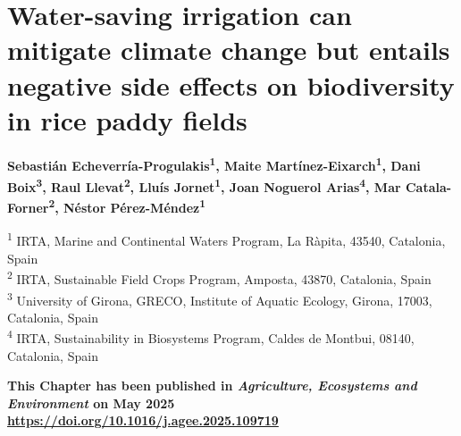\chapter{Water-saving irrigation can mitigate climate change but entails negative side effects on biodiversity in rice paddy fields}
\label{Chapter1}

\begin{center}
\textbf{
Sebastián Echeverría-Progulakis\textsuperscript{1},
Maite Martínez-Eixarch\textsuperscript{1},
Dani Boix\textsuperscript{3},
Raul Llevat\textsuperscript{2},
Lluís Jornet\textsuperscript{1},
Joan Noguerol Arias\textsuperscript{4},
Mar Catala-Forner\textsuperscript{2},
Néstor Pérez-Méndez\textsuperscript{1}
}
\end{center}

\vspace{1ex}

\begin{center}
\textsuperscript{1} IRTA, Marine and Continental Waters Program, La Ràpita, 43540, Catalonia, Spain \\
\textsuperscript{2} IRTA, Sustainable Field Crops Program, Amposta, 43870, Catalonia, Spain  \\
\textsuperscript{3} University of Girona, GRECO, Institute of Aquatic Ecology, Girona, 17003, Catalonia, Spain\\
\textsuperscript{4} IRTA, Sustainability in Biosystems Program, Caldes de Montbui, 08140, Catalonia, Spain
\end{center}

\begin{center}
{\footnotesize  
\textbf{This Chapter has been published in \textit{Agriculture, Ecosystems and Environment} on May 2025\\
\color{blue}\url{https://doi.org/10.1016/j.agee.2025.109719}}}
\end{center}

